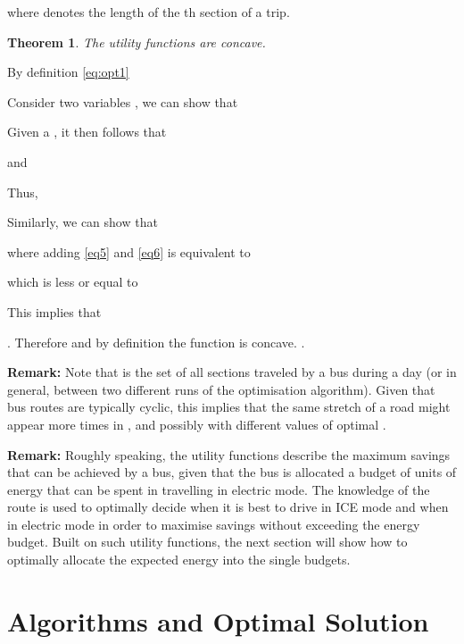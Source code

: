 \documentclass[journal]{IEEEtran}
\newtheorem{theorem}{Theorem}
{ \theorembodyfont{\normalfont} \newtheorem{example}[theorem]{Example}
	\newtheorem{remark}[theorem]{Remark}
}
\begin{document}
where  denotes the length of the th section of a trip.
\begin{theorem}
	\label{Lemma1}
	The utility functions  are concave.
\end{theorem}

 By definition \eqref{eq:opt1}


Consider two variables , we can show that 

Given a , it then follows that

and 

Thus,

Similarly, we can show that  

where adding \eqref{eq5} and \eqref{eq6} is equivalent to

which is less or equal to 

This implies that


. Therefore  and by definition the function  is concave. .\newline


\noindent \textbf{Remark:} Note that  is the set of all sections traveled by a bus during a day (or in general, between two different runs of the optimisation algorithm). Given that bus routes are typically cyclic, this implies that the same stretch of a road might appear more times in , and possibly with different values of optimal .\newline

\noindent \textbf{Remark:} Roughly speaking, the utility functions describe the maximum  savings that can be achieved by a bus, given that the bus is allocated a budget of  units of energy that can be spent in travelling in electric mode. The knowledge of the route is used to optimally decide when it is best to drive in ICE mode and when in electric mode in order to maximise  savings without exceeding the energy budget. Built on such utility functions, the next section will show how to optimally allocate the expected energy  into the single budgets.



\section{Algorithms and Optimal Solution}
\label{AIMD_Optimisation}
\end{document}
